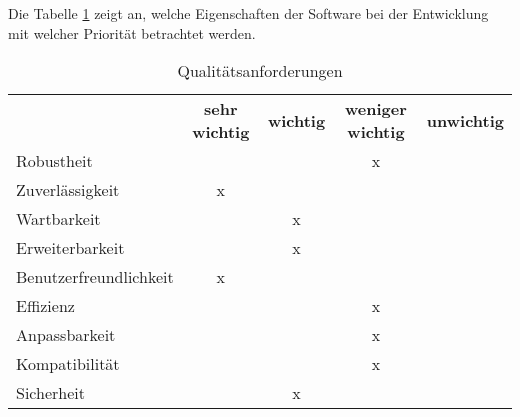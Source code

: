 Die Tabelle \ref{tabelle:qualitaetsanforderungen} zeigt an, welche Eigenschaften der Software bei der Entwicklung mit welcher Priorität betrachtet werden.

\begin{table}[h]
	\centering
	\begin{tabularx}{\textwidth}{l c c c c}
		\rowcolor[HTML]{C0C0C0} 
		& \textbf{sehr wichtig} & \textbf{wichtig} & \textbf{weniger wichtig} & \textbf{unwichtig} \\
		Robustheit &  &  & x &  \\
		\rowcolor[HTML]{E7E7E7} 
		Zuverlässigkeit & x &  &  &  \\
		Wartbarkeit &  & x &  &  \\
		\rowcolor[HTML]{E7E7E7} 
		Erweiterbarkeit &  & x &  &  \\
		Benutzerfreundlichkeit & x &  &  &  \\
		\rowcolor[HTML]{E7E7E7} 
		Effizienz &  &  & x &  \\
		Anpassbarkeit &  &  & x &  \\
		\rowcolor[HTML]{E7E7E7} 
		Kompatibilität &  &  & x &  \\
		Sicherheit &  & x &  & 
	\end{tabularx}
	\caption{Qualitätsanforderungen}
	\label{tabelle:qualitaetsanforderungen}
\end{table}